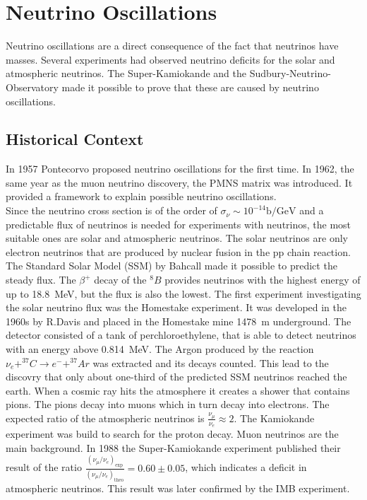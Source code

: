 \section{Neutrino Oscillations \cite{oszis}}
Neutrino oscillations are a direct consequence of the fact that neutrinos have masses. Several experiments had observed neutrino deficits for the solar and atmospheric neutrinos. The Super-Kamiokande and the Sudbury-Neutrino-Observatory made it possible to prove that these are caused by neutrino oscillations.
\subsection{Historical Context}
In 1957 Pontecorvo proposed neutrino oscillations for the first time. In 1962, the same year as the muon neutrino discovery, the PMNS matrix was introduced. It provided a framework to explain possible neutrino oscillations.\\
Since the neutrino cross section is of the order of $\sigma_{\nu} \sim 10^{-14} \si{\barn\per\giga\electronvolt}$ and a predictable flux of neutrinos is needed for experiments with neutrinos, the most suitable ones are solar and atmospheric neutrinos.
The solar neutrinos are only electron neutrinos that are produced by nuclear fusion in the pp chain reaction. The Standard Solar Model (SSM) by Bahcall made it possible to predict the steady flux. The $\beta^+$ decay of the $^{8}B$ provides neutrinos with the highest energy of up to \SI{18.8}{\mega\electronvolt}, but the flux is also the lowest.
The first experiment investigating the solar neutrino flux was the Homestake experiment. It was developed in the 1960s by R.Davis and placed in the Homestake mine \SI{1478}{\meter} underground. The detector consisted of a tank of perchloroethylene, that is able to detect neutrinos with an energy above \SI{0.814}{\mega\electronvolt}. The Argon produced by the reaction $\nu_e + ^{37}C \rightarrow e^- + ^{37}Ar$ was extracted and its decays counted. This lead to the discovry that only about one-third of the predicted SSM neutrinos reached the earth. When a cosmic ray hits the atmosphere it creates a shower that contains pions. The pions decay into muons which in turn decay into electrons. The expected ratio of the atmospheric neutrinos is $\frac{\nu_{\mu}}{\nu_e} \approx 2$. The Kamiokande experiment was build to search for the proton decay. Muon neutrinos are the main background. In 1988 the Super-Kamiokande experiment published their result of the ratio $\frac{(\nu_{\mu}/\nu_e)_\text{exp}}{(\nu_{\mu}/\nu_e)_\text{theo}} = 0.60 \pm 0.05$,
which indicates a deficit in atmospheric neutrinos. This result was later confirmed by the IMB experiment.

